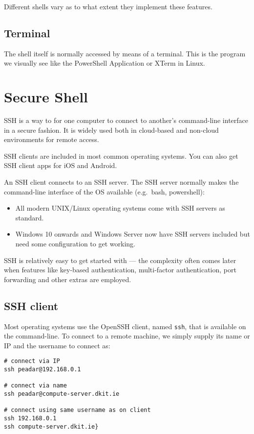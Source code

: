 Different shells vary as to what extent they implement these features.

\subsection{Terminal}

The shell itself is normally accessed by means of a terminal.
This is the program we visually see like the PowerShell Application or XTerm in Linux.

\section{Secure Shell}

SSH is a way to for one computer to connect to another's command-line
interface in a secure fashion. It is widely used both in cloud-based and
non-cloud environments for remote access.

SSH clients are included in most common operating systems. You can also
get SSH client apps for iOS and Android.

An SSH client connects to an SSH server.
The SSH server normally makes the command-line interface of the OS available (e.g.~bash, powershell):
\begin{itemize}
\item All modern UNIX/Linux operating systems come with SSH servers as standard.
\item Windows 10 onwards and Windows Server now have SSH servers included but need some configuration to get working.
\end{itemize}
  
SSH is relatively easy to get started with --- the complexity often comes
later when features like key-based authentication, multi-factor
authentication, port forwarding and other extras are employed.

\subsection{SSH client}
\label{ssh-client}

Most operating systems use the OpenSSH client, named \texttt{ssh}, that is available on the command-line.
To connect to a remote machine, we simply supply its name or IP and the username to connect as:

\begin{verbatim}
# connect via IP
ssh peadar@192.168.0.1

# connect via name
ssh peadar@compute-server.dkit.ie

# connect using same username as on client
ssh 192.168.0.1
ssh compute-server.dkit.ie}
\end{verbatim}

